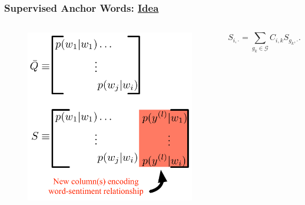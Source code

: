 \documentclass[compress]{beamer}
\newcommand{\unsupmat}[1]{\bar{Q}_{#1}}
\newcommand{\suprow}[1]{S_{#1, \cdot}}
\newcommand{\coef}[1]{C_{#1}}
\begin{document}
%


\begin{frame}
\frametitle{Supervised Anchor Words: \underline{Idea}}

\begin{columns}
\begin{figure}
\centering
\includegraphics[width=0.9\linewidth]{spectral/augmented_matrix.pdf}
\end{figure}

\begin{equation*}
  \suprow{i} = \sum_{g_k \in \mathcal{G}} \coef{i,k} \suprow{g_k} .
\label{eq:lincomb-2}
\end{equation*}
\end{columns}
\end{frame}
\end{document}
